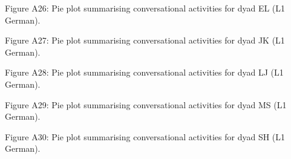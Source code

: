 \begin{stylecaption}
Figure A26: Pie plot summarising conversational activities for dyad EL (L1 German).
\end{stylecaption}

\begin{stylecaption}
  
 
\end{stylecaption}

\begin{stylecaption}
Figure A27: Pie plot summarising conversational activities for dyad JK (L1 German).
\end{stylecaption}

\begin{stylecaption}
  
 
\end{stylecaption}

\begin{stylecaption}
Figure A28: Pie plot summarising conversational activities for dyad LJ (L1 German).
\end{stylecaption}

\begin{stylecaption}
  
 
\end{stylecaption}

\begin{stylecaption}
Figure A29: Pie plot summarising conversational activities for dyad MS (L1 German).
\end{stylecaption}

\begin{stylecaption}
  
 
\end{stylecaption}

\begin{stylecaption}
Figure A30: Pie plot summarising conversational activities for dyad SH (L1 German).
\end{stylecaption}

